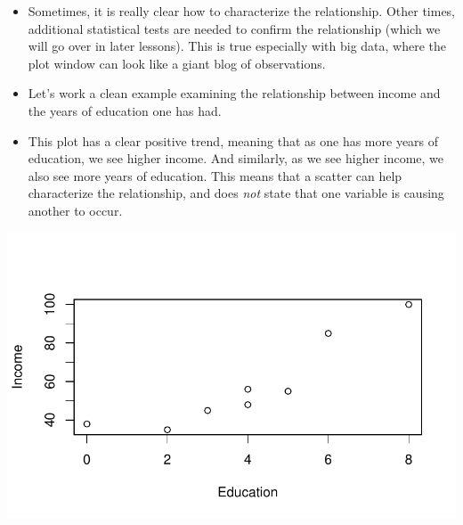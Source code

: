 \documentclass[
  letterpaper,
  DIV=11,
  numbers=noendperiod]{scrreprt}
\newenvironment{Shaded}{\begin{snugshade}}{\end{snugshade}}
\newcommand{\AttributeTok}[1]{\textcolor[rgb]{0.40,0.45,0.13}{#1}}
\newcommand{\FunctionTok}[1]{\textcolor[rgb]{0.28,0.35,0.67}{#1}}
\newcommand{\NormalTok}[1]{\textcolor[rgb]{0.00,0.23,0.31}{#1}}
\newcommand{\OtherTok}[1]{\textcolor[rgb]{0.00,0.23,0.31}{#1}}
\newcommand{\SpecialCharTok}[1]{\textcolor[rgb]{0.37,0.37,0.37}{#1}}
\newcommand{\StringTok}[1]{\textcolor[rgb]{0.13,0.47,0.30}{#1}}
\begin{document}
\begin{itemize}
\item
  Sometimes, it is really clear how to characterize the relationship.
  Other times, additional statistical tests are needed to confirm the
  relationship (which we will go over in later lessons). This is true
  especially with big data, where the plot window can look like a giant
  blog of observations.
\item
  Let's work a clean example examining the relationship between income
  and the years of education one has had.
\item
  This plot has a clear positive trend, meaning that as one has more
  years of education, we see higher income. And similarly, as we see
  higher income, we also see more years of education. This means that a
  scatter can help characterize the relationship, and does \emph{not}
  state that one variable is causing another to occur.
\end{itemize}

\begin{Shaded}
\end{Shaded}

\includegraphics{dataviz_files/figure-pdf/unnamed-chunk-44-1.pdf}
\end{document}
